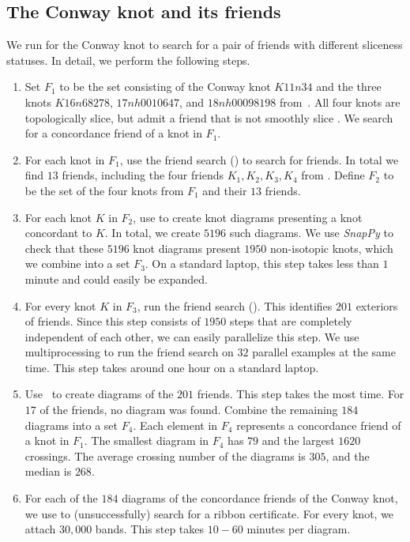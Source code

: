 \documentclass{amsart} %
\theoremstyle{thm}
\theoremstyle{definition}
\numberwithin{equation}{section}
\begin{document}
\subsection{The Conway knot and its friends}

We run  for the Conway knot to search for a pair of friends with different sliceness statuses. In detail, we perform the following steps.

\begin{enumerate}
    \item Set $F_1$ to be the set consisting of the Conway knot $K11n34$ and the three knots $K16n68278$, $17nh0010647$, and $18nh00098198$ from~\cite{Dunfield_Gong}. All four knots are topologically slice, but admit a friend that is not smoothly slice \cite{Piccirillo_Conway_knot,Dunfield_Gong}. We search for a concordance friend of a knot in $F_1$.
    \item For each knot in $F_1$, use the friend search () to search for friends. In total we find $13$ friends, including the four friends $K_1,K_2,K_3,K_4$ from . Define $F_2$ to be the set of the four knots from $F_1$ and their $13$ friends.
    \item For each knot $K$ in $F_2$, use  to create knot diagrams presenting a knot concordant to $K$. In total, we create $5196$ such diagrams. We use {\em SnapPy} to check that these $5196$ knot diagrams present $1950$ non-isotopic knots, which we combine into a set $F_3$. On a standard laptop, this step takes less than $1$ minute and could easily be expanded.
    \item For every knot $K$ in $F_3$, run the friend search (). This identifies $201$ exteriors of friends. Since this step consists of $1950$ steps that are completely independent of each other, we can easily parallelize this step. We use multiprocessing to run the friend search on $32$ parallel examples at the same time. This step takes around one hour on a standard laptop. 
    \item Use~\cite{Dunfield_exterior_to_link} to create diagrams of the $201$ friends. This step takes the most time. For $17$ of the friends, no diagram was found. Combine the remaining $184$ diagrams into a set $F_4$. Each element in $F_4$ represents a concordance friend of a knot in $F_1$. The smallest diagram in $F_4$ has $79$ and the largest $1620$ crossings. The average crossing number of the diagrams is $305$, and the median is $268$.
    \item For each of the $184$ diagrams of the concordance friends of the Conway knot, we use  to (unsuccessfully) search for a ribbon certificate. For every knot, we attach $30,000$ bands. This step takes $10-60$ minutes per diagram. 

\end{enumerate}
\end{document}
